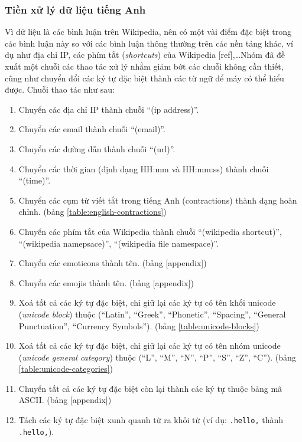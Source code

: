 \subsubsection{Tiền xử lý dữ liệu tiếng Anh}\label{english-preprocess}
Vì dữ liệu là các bình luận trên Wikipedia, nên có một vài điểm đặc biệt trong các bình luận này so với các bình luận thông thường trên các nền tảng khác, ví dụ như địa chỉ IP, các phím tắt (\textit{shortcuts}) của Wikipedia [ref],\dots Nhóm đã đề xuất một chuỗi các thao tác xử lý nhằm giảm bớt các chuỗi không cần thiết, cũng như chuyển đổi các ký tự đặc biệt thành các từ ngữ để máy có thể hiểu được. Chuỗi thao tác như sau:
\begin{enumerate}
    \item Chuyển các địa chỉ IP thành chuỗi ``(ip address)''.
    \item Chuyển các email thành chuỗi ``(email)''.
    \item Chuyển các đường dẫn thành chuỗi ``(url)''.
    \item Chuyển các thời gian (định dạng HH:mm và HH:mm:ss) thành chuỗi ``(time)''.
    \item Chuyển các cụm từ viết tắt trong tiếng Anh (contractions) thành dạng hoàn chỉnh. (bảng \ref{table:english-contractions})
    \item Chuyển các phím tắt của Wikipedia thành chuỗi ``(wikipedia shortcut)'', ``(wikipedia namepsace)'', ``(wikipedia file namespace)''.
    \item Chuyển các emoticons thành tên. (bảng [appendix])
    \item Chuyển các emojis thành tên. (bảng [appendix])
    \item Xoá tất cả các ký tự đặc biệt, chỉ giữ lại các ký tự có tên khối unicode (\textit{unicode block}) thuộc (``Latin'', ``Greek'', ``Phonetic'', ``Spacing'', ``General Punctuation'', ``Currency Symbols''). (bảng \ref{table:unicode-blocks})
    \item Xoá tất cả các ký tự đặc biệt, chỉ giữ lại các ký tự có tên nhóm unicode (\textit{unicode general category}) thuộc (``L'', ``M'', ``N'', ``P'', ``S'', ``Z'', ``C''). (bảng \ref{table:unicode-categories})
    \item Chuyển tất cả các ký tự đặc biệt còn lại thành các ký tự thuộc bảng mã ASCII. (bảng [appendix])
    \item Tách các ký tự đặc biệt xunh quanh từ ra khỏi từ (ví dụ: {\tt .hello,} thành {\tt .\textvisiblespace hello\textvisiblespace,}).
\end{enumerate}

